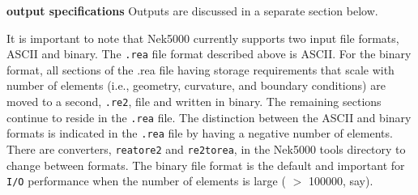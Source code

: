 \begin{description}
\begin{comment}
7. A difficulty with the current nek history point specification is finding the requisite ijke (e=element
number) values that correlate to the point of interest. There is a way to do this in postx that
is relatively painless, but this is not useful for very large problems. (The approach is:
SET PLOT FORMAT
SCALAR
VALUES
PLOT
Follow the instructions and for each point requested, postx will write to the screen lines that
are similar to the above, ready to be pasted into the .rea file.)
8. When you run nek, it will write the coordinate information to the logfile on the first timestep
so that you can verify the point locations.
\end{comment}
\item{\bf output specifications} 
     Outputs are discussed in a separate section below.
\end{description}


\noindent
It is important to note that Nek5000 currently supports two input file
formats, ASCII and binary.   The {\tt .rea} file format
described above is ASCII.  For the binary format, all sections
of the .rea file having storage requirements that scale with 
number of elements (i.e., geometry, curvature, and boundary 
conditions) are moved to a second, {\tt .re2}, file and
written in binary.   The remaining sections continue to 
reside in the {\tt .rea} file.   The distinction between
the ASCII and binary formats is indicated in the {\tt .rea}
file by having a negative number of elements.
There are converters, {\tt reatore2} and {\tt re2torea}, in the Nek5000
tools directory to change between formats.   The binary file
format is the default and important for {\tt I/O} performance when the
number of elements is large ( \(>\) 100000, say).
